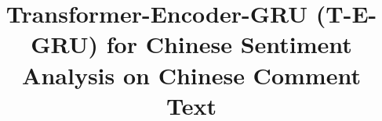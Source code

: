 %
%
%
%
%
%
\RequirePackage{fix-cm}
%
\documentclass[smallextended]{svjour3}       %
%
\smartqed  %
%

\usepackage{graphicx}
\usepackage{subfigure}
\usepackage{cite}
\usepackage{amsfonts}
\usepackage{multirow}
\usepackage{verbatim}
\usepackage{indentfirst}
\usepackage[shortlabels]{enumitem}
%
%
\usepackage{amsmath}
%
%
%


\title{Transformer-Encoder-GRU (T-E-GRU) for Chinese Sentiment Analysis on Chinese Comment Text%
}


